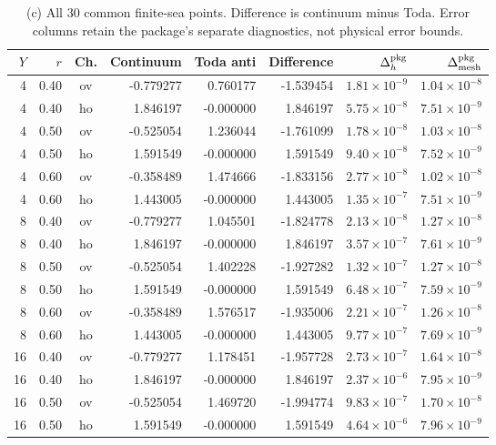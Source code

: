 \documentclass[11pt,a4paper]{article}
\begin{document}
\begingroup\small\setlength{\tabcolsep}{4pt}
\begin{longtable}{@{}rrcrrrrr@{}}
\caption{(c) All 30 common finite-sea points. Difference is continuum minus Toda. Error columns retain the package's separate diagnostics, not physical error bounds.}\\
\toprule $Y$ & $r$ & Ch. & Continuum & Toda anti & Difference & $\Delta_h^{\rm pkg}$ & $\Delta_{\rm mesh}^{\rm pkg}$\\\midrule\endhead
4 & 0.40 & ov & -0.779277 & 0.760177 & -1.539454 & $1.81\times10^{-9}$ & $1.04\times10^{-8}$\\
4 & 0.40 & ho & 1.846197 & -0.000000 & 1.846197 & $5.75\times10^{-8}$ & $7.51\times10^{-9}$\\
4 & 0.50 & ov & -0.525054 & 1.236044 & -1.761099 & $1.78\times10^{-8}$ & $1.03\times10^{-8}$\\
4 & 0.50 & ho & 1.591549 & -0.000000 & 1.591549 & $9.40\times10^{-8}$ & $7.52\times10^{-9}$\\
4 & 0.60 & ov & -0.358489 & 1.474666 & -1.833156 & $2.77\times10^{-8}$ & $1.02\times10^{-8}$\\
4 & 0.60 & ho & 1.443005 & -0.000000 & 1.443005 & $1.35\times10^{-7}$ & $7.51\times10^{-9}$\\
8 & 0.40 & ov & -0.779277 & 1.045501 & -1.824778 & $2.13\times10^{-8}$ & $1.27\times10^{-8}$\\
8 & 0.40 & ho & 1.846197 & -0.000000 & 1.846197 & $3.57\times10^{-7}$ & $7.61\times10^{-9}$\\
8 & 0.50 & ov & -0.525054 & 1.402228 & -1.927282 & $1.32\times10^{-7}$ & $1.27\times10^{-8}$\\
8 & 0.50 & ho & 1.591549 & -0.000000 & 1.591549 & $6.48\times10^{-7}$ & $7.59\times10^{-9}$\\
8 & 0.60 & ov & -0.358489 & 1.576517 & -1.935006 & $2.21\times10^{-7}$ & $1.26\times10^{-8}$\\
8 & 0.60 & ho & 1.443005 & -0.000000 & 1.443005 & $9.77\times10^{-7}$ & $7.69\times10^{-9}$\\
16 & 0.40 & ov & -0.779277 & 1.178451 & -1.957728 & $2.73\times10^{-7}$ & $1.64\times10^{-8}$\\
16 & 0.40 & ho & 1.846197 & -0.000000 & 1.846197 & $2.37\times10^{-6}$ & $7.95\times10^{-9}$\\
16 & 0.50 & ov & -0.525054 & 1.469720 & -1.994774 & $9.83\times10^{-7}$ & $1.70\times10^{-8}$\\
16 & 0.50 & ho & 1.591549 & -0.000000 & 1.591549 & $4.64\times10^{-6}$ & $7.96\times10^{-9}$\\

\end{longtable}
\end{document}
